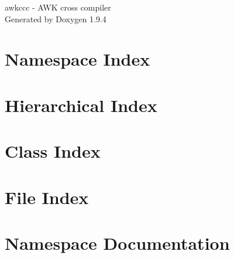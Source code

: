 \documentclass[twoside]{book}
\newcommand{\+}{\discretionary{\mbox{\scriptsize$\hookleftarrow$}}{}{}}
\newcommand{\clearemptydoublepage}{%
    \newpage{\pagestyle{empty}\cleardoublepage}%
  }
\begin{document}
  \raggedbottom
    \hypersetup{pageanchor=false,
                bookmarksnumbered=true,
                pdfencoding=unicode
               }
  \begin{titlepage}
  \vspace*{7cm}
  \begin{center}%
  {\Large awkccc -\/ AWK cross compiler}\\
  \vspace*{1cm}
  {\large Generated by Doxygen 1.9.4}\\
  \end{center}
  \end{titlepage}
  \clearemptydoublepage
  \tableofcontents
  \clearemptydoublepage
  \hypersetup{pageanchor=true}
\chapter{Namespace Index}

\chapter{Hierarchical Index}

\chapter{Class Index}

\chapter{File Index}

\chapter{Namespace Documentation}





\end{document}
